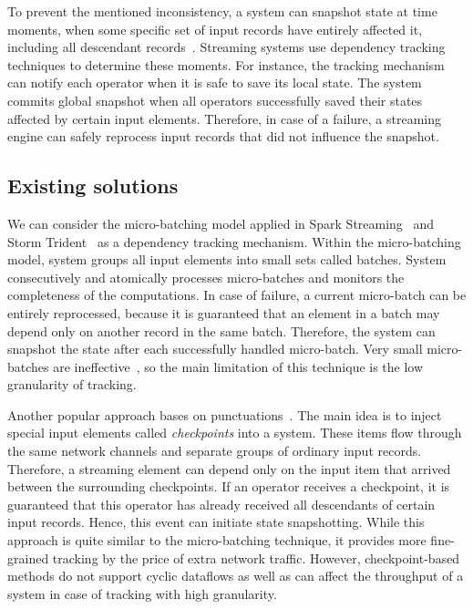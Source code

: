 To prevent the mentioned inconsistency, a system can snapshot state at time moments, when some specific set of input records have entirely affected it, including all descendant records~\cite{2015arXiv150608603C, thepaper}. Streaming systems use dependency tracking techniques to determine these moments. For instance, the tracking mechanism can notify each operator when it is safe to save its local state. The system commits global snapshot when all operators successfully saved their states affected by certain input elements. Therefore, in case of a failure, a streaming engine can safely reprocess input records that did not influence the snapshot.

\subsection{Existing solutions}
We can consider the micro-batching model applied in Spark Streaming~\cite{Zaharia:2012:DSE:2342763.2342773} and Storm Trident~\cite{apache:storm:trident} as a dependency tracking mechanism. Within the micro-batching model, system groups all input elements into small sets called batches. System consecutively and atomically processes micro-batches and monitors the completeness of the computations. In case of failure, a current micro-batch can be entirely reprocessed, because it is guaranteed that an element in a batch may depend only on another record in the same batch. Therefore, the system can snapshot the state after each successfully handled micro-batch. Very small micro-batches are ineffective~\cite{Zaharia:2012:DSE:2342763.2342773}, so the main limitation of this technique is the low granularity of tracking.

Another popular approach bases on punctuations~\cite{Tucker:2003:EPS:776752.776780}. The main idea is to inject special input elements called {\em checkpoints} into a system. These items flow through the same network channels and separate groups of ordinary input records. Therefore, a streaming element can depend only on the input item that arrived between the surrounding checkpoints. If an operator receives a checkpoint, it is guaranteed that this operator has already received all descendants of certain input records. Hence, this event can initiate state snapshotting. While this approach is quite similar to the micro-batching technique, it provides more fine-grained tracking by the price of extra network traffic. However, checkpoint-based methods do not support cyclic dataflows as well as can affect the throughput of a system in case of tracking with high granularity.
